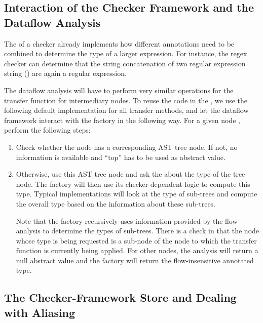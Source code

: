 \subsection{Interaction of the Checker Framework and the Dataflow Analysis}
\label{sec:flow-cf-interaction}

The  of a checker already implements how different annotations
need to be combined to determine the type of a larger expression.  For instance,
the regex checker can determine that the string concatenation of two regular expression
string () are again a regular expression.

The dataflow analysis will have to perform very similar operations for the transfer function
for intermediary nodes.  To reuse the code in the , we
use the following default implementation for all transfer methods, and let
the dataflow framework interact with the factory in the following way.
For a given node , perform the following steps:
\begin{enumerate}
    \item Check whether the node has a corresponding AST tree node. If not, no information is
    available and ``top'' has to be used as abstract value.
    \item Otherwise, use this AST tree node and ask the  about
    the type of the tree node.  The factory will then use its checker-dependent logic
    to compute this type.  Typical implementations will look at the type
    of sub-trees and compute the overall type based on the information about these sub-trees.
    
    Note that the factory recursively uses information provided by the flow analysis to determine
    the types of sub-trees.  There is a check in  that the node whose type
    is being requested is a sub-node of the node to which the transfer function is currently being
    applied.  For other nodes, the analysis will return a null abstract value and the factory will
    return the flow-insensitive annotated type.
\end{enumerate}



\subsection{The Checker-Framework Store and Dealing with Aliasing}

